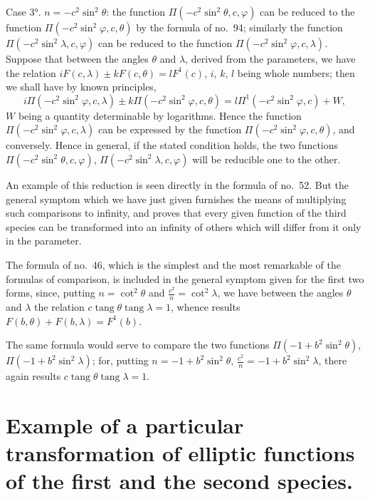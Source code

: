 \documentclass{article}
\begin{document}
Case 3°. $n=-c^{2}\sin^{2}\theta$: the function $\Pi(-c^{2}\sin^{2}\theta,c,\varphi)$ can be reduced to the function $\Pi(-c^{2}\sin^{2}\varphi,c,\theta)$ by the formula of no.\ 94; similarly the function $\Pi(-c^{2}\sin^{2}\lambda,c,\varphi)$ can be reduced to the function $\Pi(-c^{2}\sin^{2}\varphi,c,\lambda)$. Suppose that between the angles $\theta$ and $\lambda$, derived from the parameters, we have the relation $iF(c,\lambda)\pm kF(c,\theta)=lF^{1}(c)$, $i$, $k$, $l$ being whole numbers; then we shall have by known principles,
\[ i\Pi(-c^{2}\sin^{2}\varphi,c,\lambda)\pm k\Pi(-c^{2}\sin^{2}\varphi,c,\theta)=l\Pi^{1}(-c^{2}\sin^{2}\varphi,c)+W, \]
$W$ being a quantity determinable by logarithms. Hence the function $\Pi(-c^{2}\sin^{2}\varphi,c,\lambda)$ can be expressed by the function $\Pi(-c^{2}\sin^{2}\varphi,c,\theta)$, and conversely. Hence in general, if the stated condition holds, the two functions $\Pi(-c^{2}\sin^{2}\theta,c,\varphi)$, $\Pi(-c^{2}\sin^{2}\lambda,c,\varphi)$ will be reducible one to the other.

An example of this reduction is seen directly in the formula of no.\ 52. But the general symptom which we have just given furnishes the means of multiplying such comparisons to infinity, and proves that every given function of the third species can be transformed into an infinity of others which will differ from it only in the parameter.


The formula of no.\ 46, which is the simplest and the most remarkable of the formulas of comparison, is included in the general symptom given for the first two forms, since, putting $n=\cot^{2}\theta$ and $\frac{c^{2}}{n}=\cot^{2}\lambda$, we have between the angles $\theta$ and $\lambda$ the relation $c\operatorname{tang}\theta\operatorname{tang}\lambda=1$, whence results $F(b,\theta)+F(b,\lambda)=F^{1}(b)$.

The same formula would serve to compare the two functions $\Pi(-1+b^{2}\sin^{2}\theta)$, $\Pi(-1+b^{2}\sin^{2}\lambda)$; for, putting $n=-1+b^{2}\sin^{2}\theta$, $\frac{c^{2}}{n}=-1+b^{2}\sin^{2}\lambda$, there again results $c\operatorname{tang}\theta\operatorname{tang}\lambda=1$.

\section*{Example of a particular transformation of elliptic functions of the first and the second species.}
\end{document}
